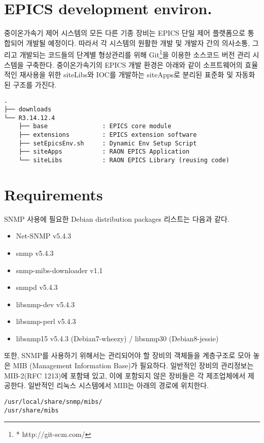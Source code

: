 \documentclass[11pt
  , a4paper
  , article
  , oneside
]{memoir}
\begin{document}
\section{EPICS development environ.}
중이온가속기 제어 시스템의 모든 다른 기종 장비는 EPICS 단일 제어 플랫폼으로 통합되어 개발될 예정이다. 따라서 각 시스템의 원활한 개발 및 개발자 간의 의사소통, 그리고 개발되는 코드들의 단계별 형상관리를 위해  Git\footnote{* http://git-scm.com/}을 이용한 소스코드 버전 관리 시스템을 구축한다. 중이온가속기의 EPICS 개발 환경은 아래와 같이 소프트웨어의 효율적인 재사용을 위한 siteLibs와 IOC를 개발하는 siteApps로 분리된 표준화 및 자동화된 구조를 가진다.

{\scriptsize
\begin{verbatim}
.
├── downloads              
└── R3.14.12.4             
    ├── base               : EPICS core module
    ├── extensions         : EPICS extension software
    ├── setEpicsEnv.sh     : Dynamic Env Setup Script
    ├── siteApps           : RAON EPICS Application
    └── siteLibs           : RAON EPICS Library (reusing code)
\end{verbatim}
}

\section{Requirements}

SNMP 사용에 필요한 Debian distribution packages 리스트는 다음과 같다. 

\begin{itemize}
\item Net-SNMP v5.4.3
\item snmp v5.4.3
\item snmp-mibs-downloader v1.1
\item snmpd v5.4.3
\item libsnmp-dev v5.4.3
\item libsnmp-perl v5.4.3
\item libsnmp15 v5.4.3 (Debian7-wheezy) / libsnmp30 (Debian8-jessie)
\end{itemize}

 또한, SNMP를 사용하기 위해서는 관리되어야 할 장비의 객체들을 계층구조로 모아 놓은 MIB (Management Information Base)가 필요하다. 일반적인 장비의 관리정보는 MIB-2(RFC 1213)에 포함돼 있고, 이에 포함되지 않은 장비들은 각 제조업체에서 제공한다. 일반적인 리눅스 시스템에서 MIB는 아래의 경로에 위치한다.

{\scriptsize
\begin{verbatim}
/usr/local/share/snmp/mibs/ 
/usr/share/mibs
\end{verbatim}
}
\end{document}
